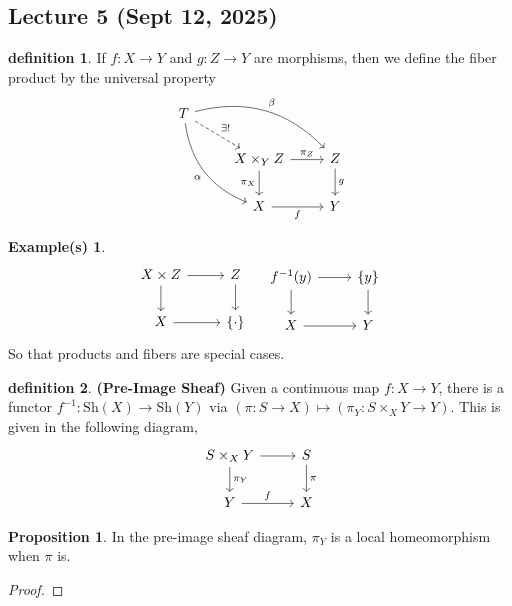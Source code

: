 \documentclass[10.5pt]{article}
\theoremstyle{definition}
\newtheorem{proposition}{Proposition}
\newtheorem{definition}{definition}
\newtheorem*{example}{Example(s)}
\newcommand{\set}[1]{\{#1\}}
\begin{document}

    \subsection{Lecture 5 (Sept 12, 2025)}

    \begin{definition}
        If \(f: X \to Y\) and \(g: Z \to Y\) are morphisms, then we define the fiber product by the universal property
        \begin{equation*}
            \begin{tikzcd}
                T
                \arrow[bend left]{drr}{\beta}
                \arrow[bend right,swap]{ddr}{\alpha}
                \arrow[dashed]{dr}{\exists !} & & \\
                & X \times_Y Z \arrow{r}{\pi_Z} \arrow{d}[swap]{\pi_X}
                & Z \arrow{d}{g} \\
                & X \arrow[swap]{r}{f}
                & Y
            \end{tikzcd}
        \end{equation*}
    \end{definition}
    \begin{example}
        \begin{equation*}
            \begin{tikzcd}
                X \times Z \arrow[r] \arrow[d] &Z \arrow[d] \\ X \arrow[r] & \set{\cdot}
            \end{tikzcd} \quad
            \begin{tikzcd}
                f^{-1}(y) \arrow[r] \arrow[d] &\set{y} \arrow[d] \\ X \arrow[r] & Y
            \end{tikzcd}
        \end{equation*}
        So that products and fibers are special cases.
    \end{example}
    \begin{definition}
        \textbf{(Pre-Image Sheaf)} Given a continuous map \(f: X \to Y\), there is a functor \(f^{-1}: \text{Sh}(X) \to \text{Sh}(Y)\) via \((\pi:S\to X) \mapsto (\pi_Y: S \times_X Y \to Y)\). This is given in the following diagram,
        \begin{equation*}
            \begin{tikzcd}
                S \times_X Y \arrow[r] \arrow[d,"\pi_Y"] &S \arrow[d,"\pi"] \\ Y \arrow[r,"f"] & X
            \end{tikzcd} 
        \end{equation*}
    \end{definition}
    \begin{proposition}
        In the pre-image sheaf diagram, \(\pi_Y\) is a local homeomorphism when \(\pi\) is.
    \end{proposition}
    \begin{proof}
        
    \end{proof}
\end{document}
